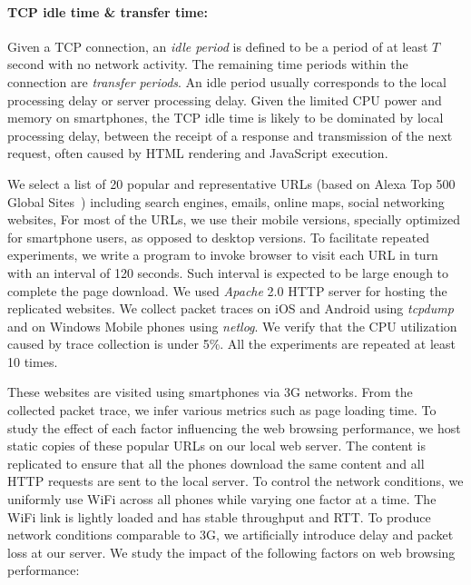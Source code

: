 \paragraph{TCP idle time \& transfer time:} Given a TCP connection, 
an {\it idle period} is defined to be a period of at least $T$ second 
with no network activity. The remaining time periods within the 
connection are {\it transfer periods}. An idle period usually 
corresponds to the local processing delay or server processing 
delay. Given the limited CPU power and memory on smartphones, the 
TCP idle time is likely to be dominated by local processing delay, 
\eg between the receipt of a response and transmission of the next 
request, often caused by HTML rendering and JavaScript execution.

\label{sec:app.setup}

We select a list of 20 popular and representative URLs (based on Alexa Top 500 Global Sites~\cite{alexa}) including search engines, emails, online maps, social networking websites, \etc
For most of the URLs, we use their mobile versions, specially optimized for smartphone users, as opposed to desktop versions. To facilitate repeated experiments, we write a program to invoke browser to visit each URL in turn with an interval of 120 seconds. Such interval is expected to be large enough to complete the page download. We used \emph{Apache} 2.0 HTTP server for hosting the replicated websites. We collect packet traces on iOS and Android using {\em tcpdump} and on Windows Mobile phones using {\em netlog}. We verify that the CPU utilization caused by trace collection is under 5\%. All the experiments are repeated at least 10 times.

These websites are visited using smartphones via 3G networks. From the collected 
packet trace, we infer various metrics such as page loading time.
To study the effect of each factor influencing the web browsing
performance, we host static copies of these popular URLs on our 
local web server. The content is replicated to ensure that all the 
phones download the same content and all HTTP requests are sent to 
the local server. To control the network conditions, we uniformly 
use WiFi across all phones while varying one factor at a time. 
The WiFi link is lightly loaded and has stable throughput and RTT. 
To produce network conditions comparable to 3G, we artificially 
introduce delay and packet loss at our server. We study the impact 
of the following factors on web browsing performance:

